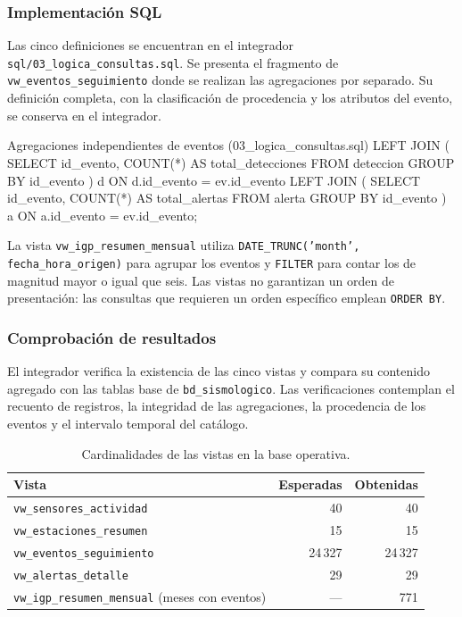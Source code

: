 \documentclass[12pt,a4paper]{article}
\begin{document}
\subsubsection*{Implementación SQL}

Las cinco definiciones se encuentran en el integrador
\nolinkurl{sql/03_logica_consultas.sql}. Se presenta el fragmento de \texttt{vw\_eventos\_seguimiento} donde se
realizan las agregaciones por separado. Su definición completa,
con la clasificación de procedencia y los atributos del evento,
se conserva en el integrador.

\begin{sqlbloque}{Agregaciones independientes de eventos (03\_logica\_consultas.sql)}
LEFT JOIN (
    SELECT id_evento, COUNT(*) AS total_detecciones
    FROM deteccion
    GROUP BY id_evento
) d ON d.id_evento = ev.id_evento
LEFT JOIN (
    SELECT id_evento, COUNT(*) AS total_alertas
    FROM alerta
    GROUP BY id_evento
) a ON a.id_evento = ev.id_evento;
\end{sqlbloque}

La vista \texttt{vw\_igp\_resumen\_mensual} utiliza
\texttt{DATE\_TRUNC('month', fecha\_hora\_origen)} para agrupar los eventos
y \texttt{FILTER} para contar los de magnitud mayor o igual que seis.
Las vistas no garantizan un orden de presentación: las consultas que
requieren un orden específico emplean \texttt{ORDER BY}.

\subsubsection*{Comprobación de resultados}

El integrador verifica la existencia de las cinco vistas y compara
su contenido agregado con las tablas base de \texttt{bd\_sismologico}.
Las verificaciones contemplan el recuento de registros, la integridad
de las agregaciones, la procedencia de los eventos y el intervalo
temporal del catálogo.

\begin{table}[H]
\centering\small
\begin{tabular}{>{\raggedright\arraybackslash}p{9.7cm}rr}
\toprule
\textbf{Vista} & \textbf{Esperadas} & \textbf{Obtenidas} \\
\midrule
\texttt{vw\_sensores\_actividad} & 40 & 40 \\
\texttt{vw\_estaciones\_resumen} & 15 & 15 \\
\texttt{vw\_eventos\_seguimiento} & 24\,327 & 24\,327 \\
\texttt{vw\_alertas\_detalle} & 29 & 29 \\
\texttt{vw\_igp\_resumen\_mensual} (meses con eventos) & --- & 771 \\
\bottomrule
\end{tabular}
\caption{Cardinalidades de las vistas en la base operativa.}
\label{tab:resultados-vistas-44}
\end{table}
\end{document}
